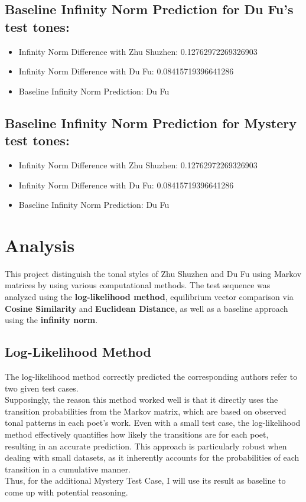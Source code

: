 \documentclass[12pt]{article}
\begin{document}
\subsection*{Baseline Infinity Norm Prediction for Du Fu's test tones:}


\begin{itemize}
    \item Infinity Norm Difference with Zhu Shuzhen: 0.12762972269326903
    \item Infinity Norm Difference with Du Fu: 0.08415719396641286
    \item Baseline Infinity Norm Prediction: Du Fu
\end{itemize}

\subsection*{Baseline Infinity Norm Prediction for Mystery test tones:}


\begin{itemize}
    \item Infinity Norm Difference with Zhu Shuzhen: 0.12762972269326903
    \item Infinity Norm Difference with Du Fu: 0.08415719396641286
    \item Baseline Infinity Norm Prediction: Du Fu
\end{itemize}

\section{Analysis}
This project distinguish the tonal styles of Zhu Shuzhen and Du Fu using Markov matrices by using various computational methods. The test sequence was analyzed using the \textbf{log-likelihood method}, equilibrium vector comparison via \textbf{Cosine Similarity} and \textbf{Euclidean Distance}, as well as a baseline approach using the \textbf{infinity norm}.

\subsection*{Log-Likelihood Method}

The log-likelihood method correctly predicted the corresponding authors refer to two given test cases.
\\
Supposingly, the reason this method worked well is that it directly uses the transition probabilities from the Markov matrix, which are based on observed tonal patterns in each poet's work. Even with a small test case, the log-likelihood method effectively quantifies how likely the transitions are for each poet, resulting in an accurate prediction. 
This approach is particularly robust when dealing with small datasets, as it inherently accounts for the probabilities of each transition in a cumulative manner.
\\
Thus, for the additional Mystery Test Case, I will use its result as baseline to come up with potential reasoning.
\end{document}
